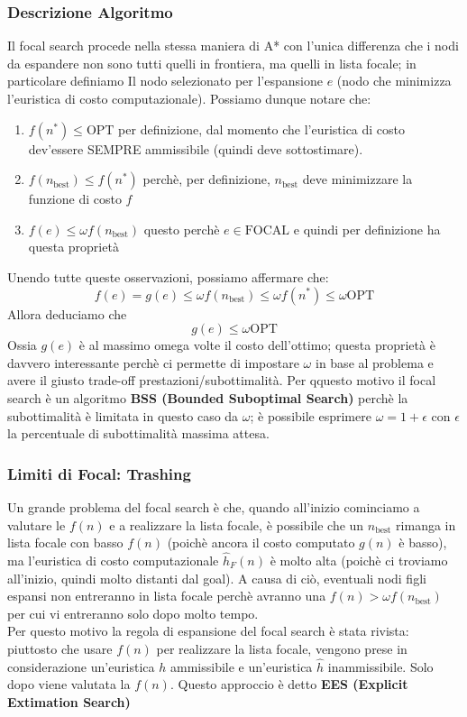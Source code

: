 \subsubsection{Descrizione Algoritmo}
Il focal search procede nella stessa maniera di A* con l'unica differenza che i nodi da espandere non sono tutti quelli in frontiera,
ma quelli in lista focale; in particolare definiamo Il nodo selezionato per l'espansione $e$ (nodo che minimizza l'euristica di costo computazionale).
Possiamo dunque notare che:
\begin{enumerate}
    \item  $f(n^*) \leq \mbox{OPT}$ per definizione, dal momento che l'euristica di costo dev'essere SEMPRE ammissibile (quindi deve sottostimare).
    \item $f(n_{\mbox{best}}) \leq f(n^*)$ perchè, per definizione, $n_{\mbox{best}}$ deve minimizzare la funzione di costo $f$
    \item $f(e) \leq \omega f(n_{\mbox{best}})$ questo perchè $e \in \mbox{FOCAL}$ e quindi per definizione ha questa proprietà 
\end{enumerate}
Unendo tutte queste osservazioni, possiamo affermare che:
\begin{equation}
    f(e) = g(e) \leq \omega f(n_{\mbox{best}}) \leq \omega f(n^*) \leq \omega \mbox{OPT}
\end{equation}
Allora deduciamo che
\begin{equation}
    g(e) \leq \omega \mbox{OPT}
\end{equation}
Ossia $g(e)$ è al massimo omega volte il costo dell'ottimo; questa proprietà è davvero interessante perchè ci permette
di impostare $\omega$ in base al problema e avere il giusto trade-off prestazioni/subottimalità. Per qquesto motivo
il focal search è un algoritmo \textbf{BSS (Bounded Suboptimal Search)} perchè la subottimalità è limitata
in questo caso da $\omega$; è possibile esprimere $\omega = 1 + \epsilon$ con $\epsilon$ la percentuale
di subottimalità massima attesa.

\subsubsection{Limiti di Focal: Trashing}
Un grande problema del focal search è che, quando all'inizio cominciamo a valutare le $f(n)$ e a realizzare la lista focale,
è possibile che un $n_{\mbox{best}}$ rimanga in lista focale con basso $f(n)$ (poichè ancora il costo computato $g(n)$ è basso),
ma l'euristica di costo computazionale $\hat{h}_F(n)$ è molto alta (poichè ci troviamo all'inizio, quindi molto distanti dal goal).
A causa di ciò, eventuali nodi figli espansi non entreranno in lista focale perchè avranno una $f(n) > \omega f(n_{\mbox{best}})$ per cui vi entreranno
solo dopo molto tempo.\\
Per questo motivo la regola di espansione del focal search è stata rivista: piuttosto che usare $f(n)$ per realizzare la lista focale,
vengono prese in considerazione un'euristica $h$ ammissibile e un'euristica $\hat{h}$ inammissibile. Solo dopo viene valutata la $f(n)$.
Questo approccio è detto \textbf{EES (Explicit Extimation Search)}
 

